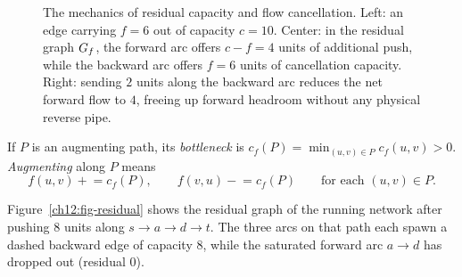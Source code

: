 \begin{figure}[H]
\caption{The mechanics of residual capacity and flow cancellation. Left: an edge carrying $f=6$ out of capacity $c=10$. Center: in the residual graph $G_f$, the forward arc offers $c-f=4$ units of additional push, while the backward arc offers $f=6$ units of cancellation capacity. Right: sending $2$ units along the backward arc reduces the net forward flow to $4$, freeing up forward headroom without any physical reverse pipe.}
\label{ch12:fig-cancellation-mechanics}
\end{figure}

If $P$ is an augmenting path, its \emph{bottleneck} is
$c_f(P)=\min_{(u,v)\in P} c_f(u,v)>0$. \emph{Augmenting} along $P$ means
\[
  f(u,v)\mathrel{+}= c_f(P),\qquad f(v,u)\mathrel{-}= c_f(P)
  \qquad\text{for each }(u,v)\in P.
\]

Figure~\ref{ch12:fig-residual} shows the residual graph of the running
network after pushing $8$ units along $s\to a\to d\to t$. The three
arcs on that path each spawn a dashed backward edge of capacity $8$, while the
saturated forward arc $a\to d$ has dropped out (residual $0$).

